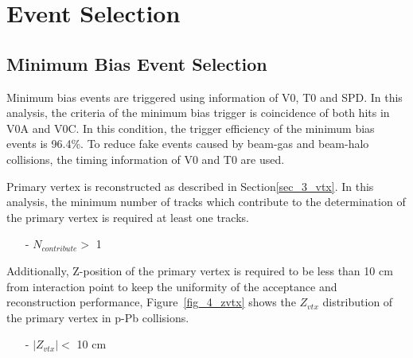 \section{Event Selection}
\label{sec_4_eventselection}
\subsection{Minimum Bias Event Selection}
Minimum bias events are triggered using information of V0, T0 and SPD.
In this analysis, the criteria of the minimum bias trigger is coincidence of both hits in V0A and V0C.
In this condition, the trigger efficiency of the minimum bias events is 96.4\%. 
To reduce fake events caused by beam-gas and beam-halo collisions, the timing information of V0 and T0 are used. 

Primary vertex is reconstructed as described in Section\ref{sec_3_vtx}. 
In this analysis, the minimum number of tracks which contribute to the determination of the primary vertex is required at least one tracks. 
\begin{itemize}
\item[-] $N_{contribute} >$ 1
\end{itemize}
Additionally, Z-position of the primary vertex is required to be less than 10 cm from interaction point to keep the uniformity of the acceptance and reconstruction performance,  
Figure~\ref{fig_4_zvtx} shows the $Z_{vtx}$ distribution of the primary vertex in p-Pb collisions. 
\begin{itemize}
\item[-] $|Z_{vtx}| < $ 10 cm
\end{itemize} 
